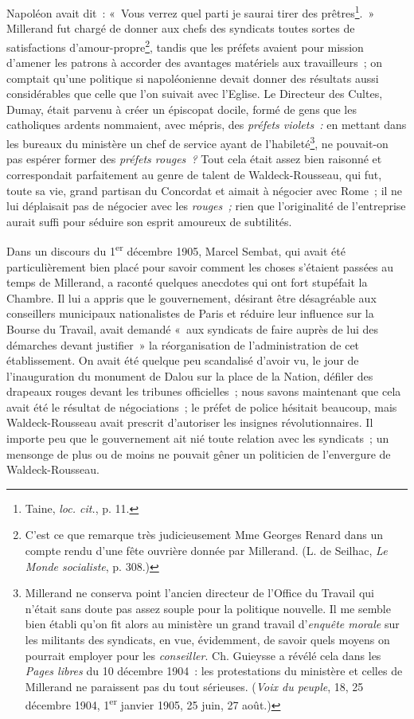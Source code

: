 \documentclass[french,twoside]{book} %
\begin{document}
Napoléon avait dit : « Vous verrez quel parti je saurai tirer des prêtres\footnote{ \noindent Taine, \emph{loc. cit.}, p. 11.
 }. » Millerand fut chargé de donner aux chefs des syndicats toutes sortes de satisfactions d’amour-propre\footnote{ \noindent C’est ce que remarque très judicieusement Mme Georges Renard dans un compte rendu d’une fête ouvrière donnée par Millerand. (L. de Seilhac, \emph{Le Monde socialiste}, p. 308.)
 }, tandis que les préfets avaient pour mission d’amener les patrons à accorder des avantages matériels aux travailleurs ; on comptait qu’une politique si napoléonienne devait donner des résultats aussi considérables que celle que l’on suivait avec l’Eglise. Le Directeur des Cultes, Dumay, était parvenu à créer un épiscopat docile, formé de gens que les catholiques ardents nommaient, avec mépris, des \emph{préfets violets :} en mettant dans les bureaux du ministère un chef de service ayant de l’habileté\footnote{ \noindent Millerand ne conserva point l’ancien directeur de l’Office du Travail qui n’était sans doute pas assez souple pour la politique nouvelle. Il me semble bien établi qu’on fit alors au ministère un grand travail d’\emph{enquête morale} sur les militants des syndicats, en vue, évidemment, de savoir quels moyens on pourrait employer pour les \emph{conseiller}. Ch. Guieysse a révélé cela dans les \emph{Pages libres} du 10 décembre 1904 : les protestations du ministère et celles de Millerand ne paraissent pas du tout sérieuses. (\emph{Voix du peuple}, 18, 25 décembre 1904, 1\textsuperscript{er} janvier 1905, 25 juin, 27 août.)
 }, ne pouvait-on pas espérer former des  \emph{préfets rouges ?} Tout cela était assez bien raisonné et correspondait parfaitement au genre de talent de Waldeck-Rousseau, qui fut, toute sa vie, grand partisan du Concordat et aimait à négocier avec Rome ; il ne lui déplaisait pas de négocier avec les \emph{rouges ;} rien que l’originalité de l’entreprise aurait suffi pour séduire son esprit amoureux de subtilités.\par
Dans un discours du 1\textsuperscript{er} décembre 1905, Marcel Sembat, qui avait été particulièrement bien placé pour savoir comment les choses s’étaient passées au temps de Millerand, a raconté quelques anecdotes qui ont fort stupéfait la Chambre. Il lui a appris que le gouvernement, désirant être désagréable aux conseillers municipaux nationalistes de Paris et réduire leur influence sur la Bourse du Travail, avait demandé « aux syndicats de faire auprès de lui des démarches devant justifier » la réorganisation de l’administration de cet établissement. On avait été quelque peu scandalisé d’avoir vu, le jour de l’inauguration du monument de Dalou sur la place de la Nation, défiler des drapeaux rouges devant les tribunes officielles ; nous savons maintenant que cela avait été le résultat de négociations ; le préfet de police hésitait beaucoup, mais Waldeck-Rousseau avait prescrit d’autoriser les insignes révolutionnaires. Il importe peu  que le gouvernement ait nié toute relation avec les syndicats ; un mensonge de plus ou de moins ne pouvait gêner un politicien de l’envergure de Waldeck-Rousseau.\par
\end{document}
